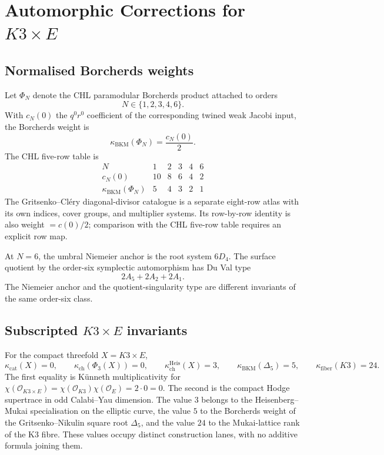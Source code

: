 \providecommand{\Lat}{\Lambda}
\providecommand{\ZZ}{\mathbb{Z}}
\providecommand{\cO}{\mathcal{O}}
\providecommand{\gBKM}{\mathfrak{g}}
\providecommand{\phioo}{\varphi_{0,1}}
\providecommand{\phimt}{\varphi_{-2,1}}
\providecommand{\kBKM}{\kappa_{\mathrm{BKM}}}
\providecommand{\kch}{\kappa_{\mathrm{ch}}}
\providecommand{\kcat}{\kappa_{\mathrm{cat}}}
\providecommand{\kfib}{\kappa_{\mathrm{fiber}}}
\providecommand{\CoHA}{\mathrm{CoHA}}
\providecommand{\Yplus}{Y^+}

\section*{Automorphic Corrections for $K3 \times E$}

\subsection*{Normalised Borcherds weights}

Let $\Phi_N$ denote the CHL paramodular Borcherds product attached to
orders
\[
  N \in \{1,2,3,4,6\}.
\]
With $c_N(0)$ the $q^0 r^0$ coefficient of the corresponding twined
weak Jacobi input, the Borcherds weight is
\[
  \kBKM(\Phi_N)=\frac{c_N(0)}{2}.
\]
The CHL five-row table is
\[
\begin{array}{c|ccccc}
N & 1 & 2 & 3 & 4 & 6\\
\hline
c_N(0) & 10 & 8 & 6 & 4 & 2\\
\kBKM(\Phi_N) & 5 & 4 & 3 & 2 & 1
\end{array}
\]
The Gritsenko--Cl\'ery diagonal-divisor catalogue is a separate eight-row
atlas with its own indices, cover groups, and multiplier systems. Its
row-by-row identity is also weight $=c(0)/2$; comparison with the CHL
five-row table requires an explicit row map.

At $N=6$, the umbral Niemeier anchor is the root system $6D_4$.  The
surface quotient by the order-six symplectic automorphism has Du Val
type
\[
  2A_5+2A_2+2A_1 .
\]
The Niemeier anchor and the quotient-singularity type are different
invariants of the same order-six class.

\subsection*{Subscripted $K3 \times E$ invariants}

For the compact threefold $X=K3\times E$,
\[
  \kcat(X)=0,\qquad
  \kch(\Phi_3(X))=0,\qquad
  \kappa_{\mathrm{ch}}^{\mathrm{Heis}}(X)=3,\qquad
  \kBKM(\Delta_{5})=5,\qquad
  \kfib(K3)=24 .
\]
The first equality is K\"unneth multiplicativity for
$\chi(\cO_{K3\times E})=\chi(\cO_{K3})\chi(\cO_E)=2\cdot 0=0$.
The second is the compact Hodge supertrace in odd Calabi--Yau dimension.
The value $3$ belongs to the Heisenberg--Mukai specialisation on the
elliptic curve, the value $5$ to the Borcherds weight of the
Gritsenko--Nikulin square root $\Delta_{5}$, and the value $24$ to the
Mukai-lattice rank of the K3 fibre.  These values occupy distinct
construction lanes, with no additive formula joining them.

